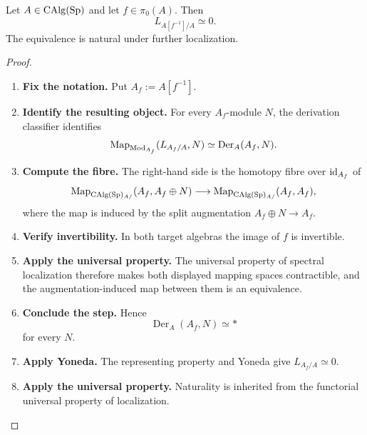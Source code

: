 \begin{lemma}
\label{lem:spectral-localization-cotangent-zero}
Let \(A\in\operatorname{CAlg}(\operatorname{Sp})\) and let \(f\in\pi_0(A)\). Then
\[
    L_{A[f^{-1}]/A}\simeq0.
\]
The equivalence is natural under further localization.
\end{lemma}

\begin{proof}
\leavevmode
\begin{enumerate}[label=\textup{(\arabic*)}]
    \item \textbf{Fix the notation.}
    Put \(A_f:=A[f^{-1}]\).

    \item \textbf{Identify the resulting object.}
    For every \(A_f\)-module \(N\), the derivation classifier identifies
    \[
        \operatorname{Map}_{\operatorname{Mod}_{A_f}}(L_{A_f/A},N)
        \simeq
        \operatorname{Der}_A(A_f,N).
    \]

    \item \textbf{Compute the fibre.}
    The right-hand side is the homotopy fibre over \(\operatorname{id}_{A_f}\) of
    \[
        \operatorname{Map}_{\operatorname{CAlg}(\operatorname{Sp})_{A/}}(A_f,A_f\oplus N)
        \longrightarrow
        \operatorname{Map}_{\operatorname{CAlg}(\operatorname{Sp})_{A/}}(A_f,A_f),
    \]
    where the map is induced by the split augmentation \(A_f\oplus N\to A_f\).

    \item \textbf{Verify invertibility.}
    In both target algebras the image of \(f\) is invertible.

    \item \textbf{Apply the universal property.}
    The universal property of spectral localization therefore makes both displayed mapping
    spaces contractible, and the augmentation-induced map between them is an equivalence.

    \item \textbf{Conclude the step.}
    Hence
    \[
        \operatorname{Der}_A(A_f,N)\simeq *
    \]
    for every \(N\).

    \item \textbf{Apply Yoneda.}
    The representing property and Yoneda give \(L_{A_f/A}\simeq0\).

    \item \textbf{Apply the universal property.}
    Naturality is inherited from the functorial universal property of localization.
\end{enumerate}
\end{proof}


